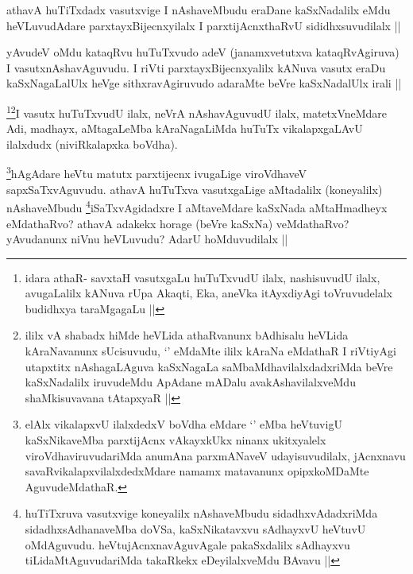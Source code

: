 \begin{artha}
athavA huTiTxdadx vasutxvige I nAshaveMbudu eraDane kaSxNadalilx eMdu heVLuvudAdare parxtayxBijecnxyilalx I parxtijAcnxthaRvU sididhxsuvudilalx ||
\end{artha}

\begin{artha}
yAvudeV oMdu kataqRvu huTuTxvudo adeV (janamxvetutxva kataqRvAgiruva) I vasutxnAshavAguvudu. I riVti parxtayxBijecnxyalilx kANuva vasutx eraDu kaSxNagaLalUlx heVge sithxravAgiruvudo adaraMte beVre kaSxNadalUlx irali ||
\end{artha}

\begin{artha}
\footnote{idara athaR- savxtaH vasutxgaLu huTuTxvudU ilalx, nashisuvudU ilalx, avugaLalilx kANuva rUpa Akaqti, Eka, aneVka itAyxdiyAgi toVruvudelalx budidhxya taraMgagaLu ||}\footnote{ililx vA shabadx hiMde heVLida athaRvanunx bAdhisalu heVLida kAraNavanunx sUcisuvudu, `\stext' eMdaMte ililx kAraNa eMdathaR I riVtiyAgi utapxtitx nAshagaLAguva kaSxNagaLa saMbaMdhavilalxdadxriMda beVre kaSxNadalilx iruvudeMdu ApAdane mADalu avakAshavilalxveMdu shaMkisuvavana tAtapxyaR ||}I vasutx huTuTxvudU ilalx, neVrA nAshavAguvudU ilalx, matetxVneMdare Adi, madhayx, aMtagaLeMba kAraNagaLiMda huTuTx vikalapxgaLAvU ilalxdudx (niviRkalapxka boVdha).
\end{artha}

\begin{artha}
\footnote{elAlx vikalapxvU ilalxdedxV boVdha eMdare `\stext' eMba heVtuvigU kaSxNikaveMba parxtijAcnx vAkayxkUkx ninanx ukitxyalelx viroVdhaviruvudariMda anumAna parxmANaveV udayisuvudilalx, jAcnxnavu savaRvikalapxvilalxdedxMdare namamx matavanunx opipxkoMDaMte AguvudeMdathaR.}hAgAdare heVtu matutx parxtijecnx ivugaLige viroVdhaveV sapxSaTxvAguvudu. athavA huTuTxva vasutxgaLige aMtadalilx (koneyalilx) nAshaveMbudu \footnote{huTiTxruva vasutxvige koneyalilx nAshaveMbudu sidadhxvAdadxriMda sidadhxsAdhanaveMba doVSa, kaSxNikatavxvu sAdhayxvU heVtuvU oMdAguvudu. heVtujAcnxnavAguvAgale pakaSxdalilx sAdhayxvu tiLidaMtAguvudariMda takaRkekx eDeyilalxveMdu BAvavu ||}iSaTxvAgidadxre I aMtaveMdare kaSxNada aMtaHmadheyx eMdathaRvo? athavA adakekx horage (beVre kaSxNa) veMdathaRvo? yAvudanunx niVnu heVLuvudu? AdarU hoMduvudilalx ||
\end{artha}

